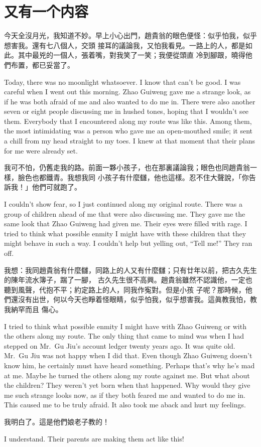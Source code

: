 \chapter{又有一个内容}
\begin{paracol}{2}[]

今天全沒月光，我知道不妙。早上小心出門，趙貴翁的眼色便怪：似乎怕我，似乎想害我。還有七八個人，交頭
接耳的議論我，又怕我看見。一路上的人，都是如此。其中最兇的一個人，張着嘴，對我笑了一笑；我便從頭直
冷到腳跟，曉得他們布置，都已妥當了。

\switchcolumn

Today, there was no moonlight whatsoever. I know that can't be good. I was careful when I went out
this morning. Zhao Guiweng gave me a strange look, as if he was both afraid of me and also wanted
to do me in. There were also another seven or eight people discussing me in hushed tones, hoping
that I wouldn't see them. Everybody that I encountered along my route was like this. Among them,
the most intimidating was a person who gave me an open-mouthed smile; it sent a chill from my head
straight to my toes. I knew at that moment that their plans for me were already set.

\switchcolumn*

我可不怕，仍舊走我的路。前面一夥小孩子，也在那裏議論我；眼色也同趙貴翁一樣，臉色也都鐵青。我想我同
小孩子有什麼讎，他也這樣。忍不住大聲說，「你告訴我！」他們可就跑了。

\switchcolumn

I couldn't show fear, so I just continued along my original route. There was a group of children
ahead of me that were also discussing me. They gave me the same look that Zhao Guiweng had given
me. Their eyes were filled with rage. I tried to think what possible enmity I might have with these
children that they might behave in such a way. I couldn't help but yelling out, ``Tell me!'' They
ran off.

\switchcolumn*

我想：我同趙貴翁有什麼讎，同路上的人又有什麼讎；只有廿年以前，把古久先生的陳年流水簿子，踹了一腳，
古久先生很不高興。趙貴翁雖然不認識他，一定也聽到風聲，代抱不平；約定路上的人，同我作寃對。但是小孩
子呢？那時候，他們還沒有出世，何以今天也睜着怪眼睛，似乎怕我，似乎想害我。這眞教我怕，教我納罕而且
傷心。

\switchcolumn

I tried to think what possible enmity I might have with Zhao Guiweng or with the others along my
route. The only thing that came to mind was when I had stepped on Mr.\ Gu Jiu's account ledger
twenty years ago. It was quite old. Mr.\ Gu Jiu was not happy when I did that. Even though Zhao
Guiweng doesn't know him, he certainly must have heard something. Perhaps that's why he's mad at
me. Maybe he turned the others along my route against me. But what about the children? They weren't
yet born when that happened. Why would they give me such strange looks now, as if they both feared
me and wanted to do me in. This caused me to be truly afraid. It also took me aback and hurt my
feelings.

\switchcolumn*

我明白了。這是他們娘老子教的！

\switchcolumn

I understand. Their parents are making them act like this!

\end{paracol}